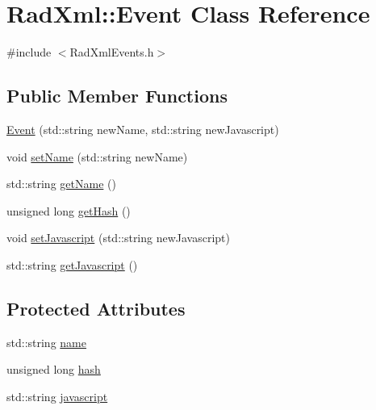 \hypertarget{class_rad_xml_1_1_event}{\section{Rad\-Xml\-:\-:Event Class Reference}
\label{class_rad_xml_1_1_event}
}


{\ttfamily \#include $<$Rad\-Xml\-Events.\-h$>$}

\subsection*{Public Member Functions}
\begin{DoxyCompactItemize}
\item 
\hyperlink{class_rad_xml_1_1_event_a1ff44c94c7abd5a768b28d8a76edd750}{Event} (std\-::string new\-Name, std\-::string new\-Javascript)
\item 
void \hyperlink{class_rad_xml_1_1_event_a2b1753b1bfaff14ba64990af39033a51}{set\-Name} (std\-::string new\-Name)
\item 
std\-::string \hyperlink{class_rad_xml_1_1_event_a5b906b178c83b1e71a0d42fd33ff254d}{get\-Name} ()
\item 
unsigned long \hyperlink{class_rad_xml_1_1_event_a0e0d537752978499c8116fc52e1e39b9}{get\-Hash} ()
\item 
void \hyperlink{class_rad_xml_1_1_event_a7a1e8f6cae5c358c17ad8ea66f4833b5}{set\-Javascript} (std\-::string new\-Javascript)
\item 
std\-::string \hyperlink{class_rad_xml_1_1_event_a90a264b2d7a86b3a39cc036980be7770}{get\-Javascript} ()
\end{DoxyCompactItemize}
\subsection*{Protected Attributes}
\begin{DoxyCompactItemize}
\item 
std\-::string \hyperlink{class_rad_xml_1_1_event_aeae92170c8036b6a1b7241052d45c437}{name}
\item 
unsigned long \hyperlink{class_rad_xml_1_1_event_aa6ea6ba257960132618d9a253f31433a}{hash}
\item 
std\-::string \hyperlink{class_rad_xml_1_1_event_a4407c39d59b84751e1840d055a649b0d}{javascript}
\end{DoxyCompactItemize}


